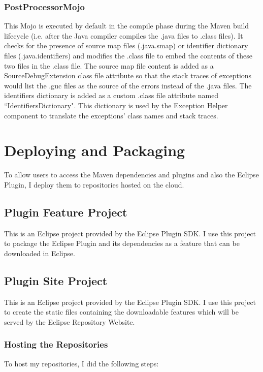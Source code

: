 \subsubsection{PostProcessorMojo}
This Mojo is executed by default in the compile phase during the Maven build lifecycle (i.e. after the Java compiler compiles the .java files to .class files). It checks for the presence of source map files (.java.smap) or identifier dictionary files (.java.identifiers) and modifies the .class file to embed the contents of these two files in the .class file. The source map file content is added as a SourceDebugExtension class file attribute so that the stack traces of exceptions would list the .guc files as the source of the errors instead of the .java files. The identifiers dictionary is added as a custom .class file attribute named ``IdentifiersDictionary". This dictionary is used by the Exception Helper component to translate the exceptions' class names and stack traces. 
\section{Deploying and Packaging}
To allow users to access the Maven dependencies and plugins and also the Eclipse Plugin, I deploy them to repositories hosted on the cloud. 
\subsection{Plugin Feature Project}
This is an Eclipse project provided by the Eclipse Plugin SDK. I use this project to package the Eclipse Plugin and its dependencies as a feature that can be downloaded in Eclipse. 
\subsection{Plugin Site Project}
This is an Eclipse project provided by the Eclipse Plugin SDK. I use this project to create the static files containing the downloadable features which will be served by the Eclipse Repository Website. 
\subsubsection{Hosting the Repositories}
To host my repositories, I did the following steps:

